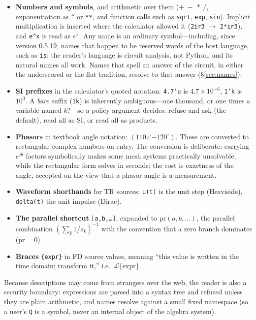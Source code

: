 \documentclass[11pt,oneside]{report}
\newcommand{\code}[1]{\texttt{#1}}
\begin{document}
\begin{itemize}
\item \textbf{Numbers and symbols}, and arithmetic over them
  ($+\ -\ *\ /$, exponentiation as \code{\^{}} or \code{**}, and
  function calls such as \code{sqrt}, \code{exp}, \code{sin}).
  Implicit multiplication is inserted where the calculator allowed it
  (\code{2ir3} $\to$ \code{2*ir3}), and \code{e\^{}x} is read as
  $e^x$. Any name is an ordinary symbol---including, since version
  0.5.19, names that happen to be reserved words of the host
  language, such as \code{is}: the reader's language is circuit
  analysis, not Python, and its natural names all work. Names that
  spell an answer of the circuit, in either the underscored or the
  flat tradition, resolve to that answer (\S\ref{sec:names}).
\item \textbf{SI prefixes} in the calculator's quoted notation:
  \code{4.7'u} is $4.7\times10^{-6}$, \code{1'k} is $10^3$. A
  \emph{bare} suffix (\code{1k}) is inherently ambiguous---one
  thousand, or one times a variable named $k$?---so a policy argument
  decides: refuse and ask (the default), read all as SI, or read all
  as products.
\item \textbf{Phasors} in textbook angle notation:
  $(110\angle{-120}^{\circ})$. These are converted to rectangular
  complex numbers on entry. The conversion is deliberate: carrying
  $e^{j\theta}$ factors symbolically makes some mesh systems
  practically unsolvable, while the rectangular form solves in
  seconds; the cost is exactness of the angle, accepted on the view
  that a phasor angle is a measurement.
\item \textbf{Waveform shorthands} for TR sources: \code{u(t)} is the
  unit step (Heaviside), \code{delta(t)} the unit impulse (Dirac).
\item \textbf{The parallel shortcut} \code{[a,b,\ldots]}, expanded to
  $\mathrm{pr}(a,b,\ldots)$, the parallel combination
  $(\sum_k 1/z_k)^{-1}$ with the convention that a zero branch
  dominates ($\mathrm{pr}=0$).
\item \textbf{Braces} \code{\{expr\}} in FD source values, meaning
  ``this value is written in the time domain; transform it,'' i.e.\
  $\mathcal{L}\{\mathrm{expr}\}$.
\end{itemize}

Because descriptions may come from strangers over the web, the reader
is also a security boundary: expressions are parsed into a syntax tree
and refused unless they are plain arithmetic, and names resolve
against a small fixed namespace (so a user's \code{Q} is a symbol,
never an internal object of the algebra system).
\end{document}
